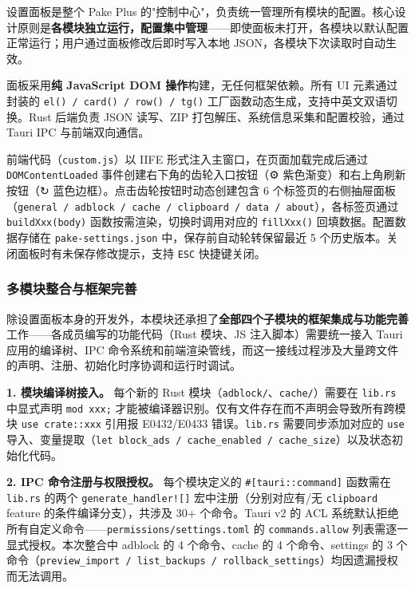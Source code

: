 \documentclass[12pt,a4paper]{ctexart}
\begin{document}
设置面板是整个 Pake Plus 的"控制中心"，负责统一管理所有模块的配置。核心设计原则是\textbf{各模块独立运行，配置集中管理}——即使面板未打开，各模块以默认配置正常运行；用户通过面板修改后即时写入本地 JSON，各模块下次读取时自动生效。

面板采用\textbf{纯 JavaScript DOM 操作}构建，无任何框架依赖。所有 UI 元素通过封装的 \texttt{el() / card() / row() / tg()} 工厂函数动态生成，支持中英文双语切换。Rust 后端负责 JSON 读写、ZIP 打包解压、系统信息采集和配置校验，通过 Tauri IPC 与前端双向通信。

前端代码（\texttt{custom.js}）以 IIFE 形式注入主窗口，在页面加载完成后通过 \texttt{DOMContentLoaded} 事件创建右下角的齿轮入口按钮（⚙ 紫色渐变）和右上角刷新按钮（↻ 蓝色边框）。点击齿轮按钮时动态创建包含 6 个标签页的右侧抽屉面板（\texttt{general / adblock / cache / clipboard / data / about}），各标签页通过 \texttt{buildXxx(body)} 函数按需渲染，切换时调用对应的 \texttt{fillXxx()} 回填数据。配置数据存储在 \texttt{pake-settings.json} 中，保存前自动轮转保留最近 5 个历史版本。关闭面板时有未保存修改提示，支持 \texttt{ESC} 快捷键关闭。

\subsubsection{多模块整合与框架完善}

除设置面板本身的开发外，本模块还承担了\textbf{全部四个子模块的框架集成与功能完善}工作——各成员编写的功能代码（Rust 模块、JS 注入脚本）需要统一接入 Tauri 应用的编译树、IPC 命令系统和前端渲染管线，而这一接线过程涉及大量跨文件的声明、注册、初始化时序协调和运行时调试。

\textbf{1. 模块编译树接入。}
每个新的 Rust 模块（\texttt{adblock/}、\texttt{cache/}）需要在 \texttt{lib.rs} 中显式声明 \texttt{mod xxx;} 才能被编译器识别。仅有文件存在而不声明会导致所有跨模块 \texttt{use crate::xxx} 引用报 E0432/E0433 错误。\texttt{lib.rs} 需要同步添加对应的 \texttt{use} 导入、变量提取（\texttt{let block\_ads / cache\_enabled / cache\_size}）以及状态初始化代码。

\textbf{2. IPC 命令注册与权限授权。}
每个模块定义的 \texttt{\#[tauri::command]} 函数需在 \texttt{lib.rs} 的两个 \texttt{generate\_handler![]} 宏中注册（分别对应有/无 \texttt{clipboard} feature 的条件编译分支），共涉及 30+ 个命令。Tauri v2 的 ACL 系统默认拒绝所有自定义命令——\texttt{permissions/settings.toml} 的 \texttt{commands.allow} 列表需逐一显式授权。本次整合中 adblock 的 4 个命令、cache 的 4 个命令、settings 的 3 个命令（\texttt{preview\_import / list\_backups / rollback\_settings}）均因遗漏授权而无法调用。
\end{document}
